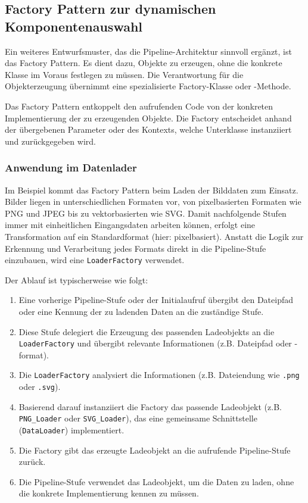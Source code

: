 \documentclass[a4paper]{article} %
\begin{document}
\subsection{Factory Pattern zur dynamischen Komponentenauswahl}
Ein weiteres Entwurfsmuster, das die Pipeline-Architektur sinnvoll ergänzt, ist das Factory Pattern. Es dient dazu, Objekte zu erzeugen, ohne die konkrete Klasse im Voraus festlegen zu müssen. Die Verantwortung für die Objekterzeugung übernimmt eine spezialisierte Factory-Klasse oder -Methode.

Das Factory Pattern entkoppelt den aufrufenden Code von der konkreten Implementierung der zu erzeugenden Objekte. Die Factory entscheidet anhand der übergebenen Parameter oder des Kontexts, welche Unterklasse instanziiert und zurückgegeben wird.

\subsubsection{Anwendung im Datenlader}
Im Beispiel kommt das Factory Pattern beim Laden der Bilddaten zum Einsatz. Bilder liegen in unterschiedlichen Formaten vor, von pixelbasierten Formaten wie PNG und JPEG bis zu vektorbasierten wie SVG. Damit nachfolgende Stufen immer mit einheitlichen Eingangsdaten arbeiten können, erfolgt eine Transformation auf ein Standardformat (hier: pixelbasiert). Anstatt die Logik zur Erkennung und Verarbeitung jedes Formats direkt in die Pipeline-Stufe einzubauen, wird eine \texttt{LoaderFactory} verwendet.

Der Ablauf ist typischerweise wie folgt:
\begin{enumerate}
    \item Eine vorherige Pipeline-Stufe oder der Initialaufruf übergibt den Dateipfad oder eine Kennung der zu ladenden Daten an die zuständige Stufe.
    \item Diese Stufe delegiert die Erzeugung des passenden Ladeobjekts an die \texttt{LoaderFactory} und übergibt relevante Informationen (z.B. Dateipfad oder -format).
    \item Die \texttt{LoaderFactory} analysiert die Informationen (z.B. Dateiendung wie \texttt{.png} oder \texttt{.svg}).
    \item Basierend darauf instanziiert die Factory das passende Ladeobjekt (z.B. \texttt{PNG\_Loader} oder \texttt{SVG\_Loader}), das eine gemeinsame Schnittstelle (\texttt{DataLoader}) implementiert.
    \item Die Factory gibt das erzeugte Ladeobjekt an die aufrufende Pipeline-Stufe zurück.
    \item Die Pipeline-Stufe verwendet das Ladeobjekt, um die Daten zu laden, ohne die konkrete Implementierung kennen zu müssen.
\end{enumerate}
\end{document}
